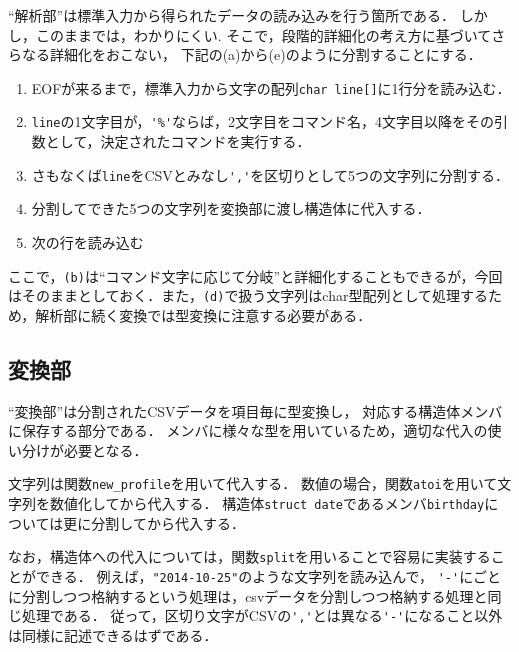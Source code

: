 \documentclass[a4paper,11pt]{jarticle}
\begin{document}
``解析部''は標準入力から得られたデータの読み込みを行う箇所である．
しかし，このままでは，わかりにくい.
そこで，段階的詳細化の考え方に基づいてさらなる詳細化をおこない，
下記の(a)から(e)のように分割することにする．

\begin{enumerate}
\setlength{\parskip}{2pt} \setlength{\itemsep}{2pt}
\renewcommand{\labelenumi}{(\alph{enumi})} %
    \item EOFが来るまで，標準入力から文字の配列\verb|char line[]|に1行分を読み込む．
    \item \verb|line|の1文字目が，\verb|'%'|ならば，2文字目をコマンド名，4文字目以降をその引数として，決定されたコマンドを実行する．
    \item さもなくば\verb|line|をCSVとみなし\verb|','|を区切りとして5つの文字列に分割する．
    \item 分割してできた5つの文字列を変換部に渡し構造体に代入する．
    \item 次の行を読み込む
\end{enumerate}

ここで，\verb|(b)|は``コマンド文字に応じて分岐''と詳細化することもできるが，今回はそのままとしておく．また，\verb|(d)|で扱う文字列はchar型配列として処理するため，解析部に続く変換では型変換に注意する必要がある．

\subsection{変換部} \label{sec:change}

``変換部''は分割されたCSVデータを項目毎に型変換し，
対応する構造体メンバに保存する部分である．
メンバに様々な型を用いているため，適切な代入の使い分けが必要となる．

文字列は関数\verb|new_profile|を用いて代入する．
数値の場合，関数\verb|atoi|を用いて文字列を数値化してから代入する．
構造体\verb|struct date|であるメンバ\verb|birthday|については更に分割してから代入する．

なお，構造体への代入については，関数\verb|split|を用いることで容易に実装することができる．
例えば，\verb|"2014-10-25"|のような文字列を読み込んで，
\verb|'-'|にごとに分割しつつ格納するという処理は，csvデータを分割しつつ格納する処理と同じ処理である．
従って，区切り文字がCSVの\verb|','|とは異なる\verb|'-'|になること以外は同様に記述できるはずである．
\end{document}
